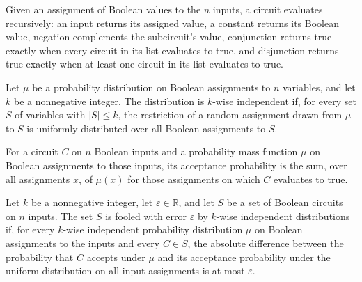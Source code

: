 \begin{definition}
\label{Circuit.eval}
\leanok
{}
Given an assignment of Boolean values to the $n$ inputs, a circuit evaluates
recursively: an input returns its assigned value, a constant returns its Boolean value,
negation complements the subcircuit's value, conjunction returns true exactly when every
circuit in its list evaluates to true, and disjunction returns true exactly when at
least one circuit in its list evaluates to true.
\end{definition}

\begin{definition}
\label{IsKWiseIndependent}
\leanok
Let $\mu$ be a probability distribution on Boolean assignments to $n$ variables, and let
$k$ be a nonnegative integer. The distribution is $k$-wise independent if, for every set
$S$ of variables with $|S|\le k$, the restriction of a random assignment drawn from
$\mu$ to $S$ is uniformly distributed over all Boolean assignments to $S$.
\end{definition}

\begin{definition}
\label{Circuit.prob}
\leanok
{}
For a circuit $C$ on $n$ Boolean inputs and a probability mass function $\mu$ on Boolean
assignments to those inputs, its acceptance probability is the sum, over all assignments
$x$, of $\mu(x)$ for those assignments on which $C$ evaluates to true.
\end{definition}

\begin{definition}
\label{Fools}
\leanok
{}
Let $k$ be a nonnegative integer, let $\varepsilon\in\mathbb{R}$, and let $S$ be a set
of Boolean circuits on $n$ inputs. The set $S$ is fooled with error $\varepsilon$ by
$k$-wise independent distributions if, for every $k$-wise independent probability
distribution $\mu$ on Boolean assignments to the inputs and every $C\in S$, the absolute
difference between the probability that $C$ accepts under $\mu$ and its acceptance
probability under the uniform distribution on all input assignments is at most
$\varepsilon$.
\end{definition}

